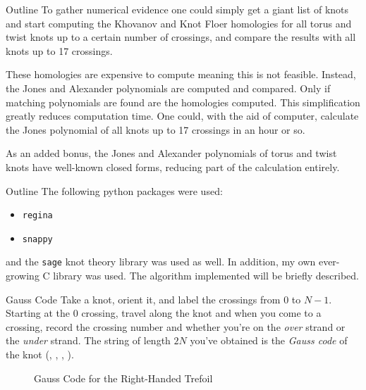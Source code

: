 \documentclass{beamer}
\begin{document}
    \begin{frame}{Outline}
        To gather numerical evidence one could simply get a giant list of knots
        and start computing the Khovanov and Knot Floer homologies for all
        torus and twist knots up to a certain number of crossings, and compare
        the results with all knots up to 17 crossings.
        \par\hfill\par
        These homologies are expensive to compute meaning this is not feasible.
        Instead, the Jones and Alexander polynomials are computed and compared.
        Only if matching polynomials are found are the
        homologies computed. This simplification greatly reduces computation
        time. One could, with the aid of computer, calculate the Jones
        polynomial of all knots up to 17 crossings in an hour or so.
        \par\hfill\par
        As an added bonus, the Jones and Alexander polynomials of
        torus and twist knots have well-known closed forms, reducing part of the
        calculation entirely.
    \end{frame}
    \begin{frame}{Outline}
        The following python packages were used:
        \begin{itemize}
            \item \texttt{regina}
            \item \texttt{snappy}
        \end{itemize}
        and the \texttt{sage} knot theory library was used as well.
        In addition, my own ever-growing C library was used. The algorithm
        implemented will be briefly described.
    \end{frame}
    \begin{frame}{Gauss Code}
        Take a knot, orient it, and label the crossings from 0 to $N-1$.
        Starting at the 0 crossing, travel along the knot and when you come
        to a crossing, record the crossing number and whether you're on the
        \textit{over} strand or the \textit{under} strand. The string of length
        $2N$ you've obtained is the \textit{Gauss code} of the knot
        (\cite{KatlasGaussCode},
        \cite{KnotInfoGaussCode},
        \cite[p.~871]{GibsonHomotopyInvariantsOfGaussWords},
        \cite[p.~507-508]{LisitsaPotapovSalehAutomataOnGaussWords}).
        \begin{figure}
            \centering
            \caption{Gauss Code for the Right-Handed Trefoil}
            \label{fig:right_handed_trefoil_gauss_code}
        \end{figure}
    \end{frame}
\end{document}
